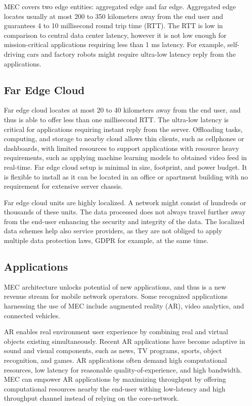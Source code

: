 MEC covers two edge entities: aggregated edge and far edge. Aggregated edge locates usually at most 200 to 350 kilometers away from the end user and guarantees 4 to 10 millisecond round trip time (RTT). The RTT is low in comparison to central data center latency, however it is not low enough for mission-critical applications requiring less than 1 ms latency. For example, self-driving cars and factory robots might require ultra-low latency reply from the applications.

\subsection{Far Edge Cloud}

Far edge cloud locates at most 20 to 40 kilometers away from the end user, and thus is able to offer less than one millisecond RTT. The ultra-low latency is critical for applications requiring instant reply from the server. Offloading tasks, computing, and storage to nearby cloud allows thin clients, such as cellphones or dashboards, with limited resources to support applications with resource heavy requirements, such as applying machine learning models to obtained video feed in real-time. Far edge cloud setup is minimal in size, footprint, and power budget. It is flexible to install as it can be located in an office or apartment building with no requirement for extensive server chassis. \cite{AirFrameOpenEdgeServer}

Far edge cloud units are highly localized. A network might consist of hundreds or thousands of these units. The data processed does not always travel further away from the end-user enhancing the security and integrity of the data. The localized data schemes help also service providers, as they are not obliged to apply multiple data protection laws, GDPR for example, at the same time. 

\subsection{Applications}

MEC architecture unlocks potential of new applications, and thus is a new revenue stream for mobile network operators. Some recognized applications harnessing the use of MEC include augmented reality (AR), video analytics, and connected vehicles.

AR enables real environment user experience by combining real and virtual objects existing simultaneously. Recent AR applications have become adaptive in sound and visual components, such as news, TV programs, sports, object recognition, and games. AR applications often demand high computational resources, low latency for reasonable quality-of-experience, and high bandwidth. MEC can empower AR applications by maximizing throughput by offering computational resources nearby the end-user withing low-latency and high throughput channel instead of relying on the core-network. \cite{Abbas2018}


